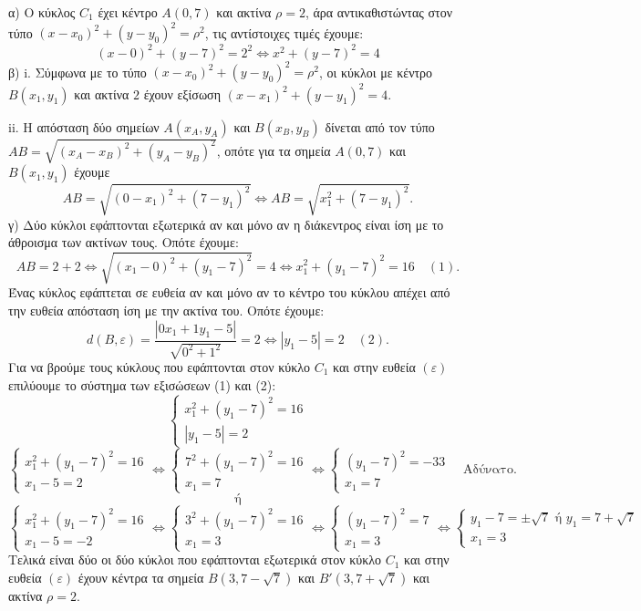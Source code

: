 α) Ο κύκλος $C_1$ έχει κέντρο $A(0,7)$ και ακτίνα $\rho=2$, άρα αντικαθιστώντας στον τύπο $(x-x_0)^2+(y-y_0)^2=\rho^2$, τις αντίστοιχες τιμές έχουμε:
\[
(x-0)^2+(y-7)^2=2^2 \Leftrightarrow x^2+(y-7)^2=4
\]
β)
i. Σύμφωνα με το τύπο $(x-x_0)^2+(y-y_0)^2=\rho^2$, οι κύκλοι με κέντρο $B(x_1,y_1)$ και ακτίνα $2$ έχουν εξίσωση $(x-x_1)^2+(y-y_1)^2=4$.

ii. Η απόσταση δύο σημείων $A(x_A,y_A)$ και $B(x_B,y_B)$ δίνεται από τον τύπο $AB=\sqrt{(x_A-x_B)^2+(y_A-y_B)^2}$, οπότε για τα σημεία $A(0,7)$ και $B(x_1,y_1)$ έχουμε
\[
AB=\sqrt{(0-x_1)^2+(7-y_1)^2} \Leftrightarrow AB=\sqrt{x_1^2+(7-y_1)^2} \text{.}
\]
γ) Δύο κύκλοι εφάπτονται εξωτερικά αν και μόνο αν η διάκεντρος είναι ίση με το άθροισμα των ακτίνων τους. Οπότε έχουμε:
\[
AB=2+2 \Leftrightarrow \sqrt{(x_1-0)^2+(y_1-7)^2}=4 \Leftrightarrow x_1^2+(y_1-7)^2=16 \quad (1).
\]
Ένας κύκλος εφάπτεται σε ευθεία αν και μόνο αν το κέντρο του κύκλου απέχει από την ευθεία απόσταση ίση με την ακτίνα του. Οπότε έχουμε:
\[
d(B,\varepsilon)=\frac{|0x_1+1y_1-5|}{\sqrt{0^2+1^2}}=2 \Leftrightarrow |y_1-5|=2 \quad (2).
\]
Για να βρούμε τους κύκλους που εφάπτονται στον κύκλο $C_1$ και στην ευθεία $(\varepsilon)$ επιλύουμε το σύστημα των εξισώσεων (1) και (2):
\[
\left\{
\begin{array}{l}
x_1^2+(y_1-7)^2=16 \\
|y_1-5|=2
\end{array}
\right.
\]
\[
\left\{
\begin{array}{l}
x_1^2+(y_1-7)^2=16 \\
x_1-5=2
\end{array}
\right. \Leftrightarrow \left\{
\begin{array}{l}
7^2+(y_1-7)^2=16 \\
x_1=7
\end{array}
\right. \Leftrightarrow \left\{
\begin{array}{l}
(y_1-7)^2=-33 \\
x_1=7
\end{array}
\right. \quad \text{Αδύνατο.}
\]
\[
\text{ή}
\]
\[
\left\{
\begin{array}{l}
x_1^2+(y_1-7)^2=16 \\
x_1-5=-2
\end{array}
\right. \Leftrightarrow \left\{
\begin{array}{l}
3^2+(y_1-7)^2=16 \\
x_1=3
\end{array}
\right. \Leftrightarrow \left\{
\begin{array}{l}
(y_1-7)^2=7 \\
x_1=3
\end{array}
\right. \Leftrightarrow \left\{
\begin{array}{l}
y_1-7=\pm\sqrt{7} \text{ ή } y_1=7+\sqrt{7} \\
x_1=3
\end{array}
\right.
\]
Τελικά είναι δύο οι δύο κύκλοι που εφάπτονται εξωτερικά στον κύκλο $C_1$ και στην ευθεία $(\varepsilon)$ έχουν κέντρα τα σημεία $B(3,7-\sqrt{7})$ και $B'(3,7+\sqrt{7})$ και ακτίνα $\rho=2$.
